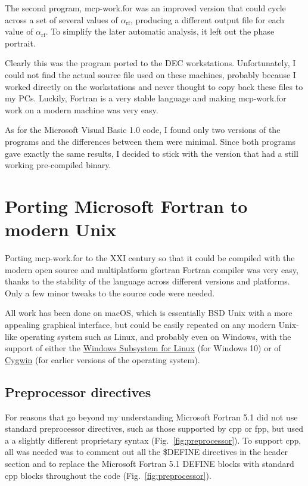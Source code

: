 The second program, \textsf{mcp-work.for} was an improved version that could cycle across a  set of several values of $\alpha_\mathrm{rf}$, producing a different output file for each value of $\alpha_\mathrm{rf}$. To simplify the later automatic analysis, it left out the phase portrait.

Clearly this was the program ported to the DEC workstations. 
Unfortunately, I could not find the actual source file used on these machines, probably because I worked directly on the workstations and never thought to copy back these files to my PCs.
Luckily, Fortran is a very stable language and making \textsf{mcp-work.for} work on a modern machine was very easy.

As for the Microsoft Visual Basic 1.0 code, I found only two versions of the programs and the differences between them were minimal. Since both programs gave exactly the same results, I decided to stick with the version that had a still working pre-compiled binary.



\section{Porting Microsoft Fortran to modern Unix}

Porting \textsf{mcp-work.for} to the XXI century so that it could be compiled with the modern open source and multiplatform \textsf{gfortran} Fortran compiler was very easy, thanks to the stability of the language across different versions and platforms. Only a few minor tweaks to the source code were needed.

All work has been done on macOS, which is essentially BSD Unix with a more appealing graphical interface, but could be easily repeated on any modern Unix-like operating system such as Linux, and probably even on Windows, with the support of either the \href{https://docs.microsoft.com/en-us/windows/wsl/}{Windows Subsystem for Linux} (for Windows 10) or of \href{http://www.cygwin.org/}{Cygwin} (for earlier versions of the operating system).



\subsection{Preprocessor directives}

For reasons that go beyond my understanding Microsoft Fortran 5.1 did not use standard preprocessor directives, such as those supported by \textsf{cpp} or \textsf{fpp}, \cite{Boyanski:1992} but used a a slightly different proprietary syntax (Fig.~\ref{fig:preprocessor}). 
To support \textsf{cpp}, all was needed was to comment out all the \textsf{\$DEFINE} directives in the header section and to replace the Microsoft Fortran 5.1 \textsf{DEFINE} blocks with standard \textsf{cpp} blocks throughout the code (Fig.~\ref{fig:preprocessor}). 

